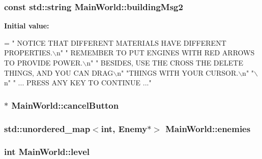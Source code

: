 \subsubsection[{building\+Msg2}]{\setlength{\rightskip}{0pt plus 5cm}const std\+::string Main\+World\+::building\+Msg2\hspace{0.3cm}{\ttfamily [private]}}\label{classMainWorld_ac33f26e815fc9f69e5119843dfc2b987}
{\bfseries Initial value\+:}
\begin{DoxyCode}
=
            \textcolor{stringliteral}{"  NOTICE THAT DIFFERENT MATERIALS HAVE DIFFERENT PROPERTIES.\(\backslash\)n"}
            \textcolor{stringliteral}{"  REMEMBER TO PUT ENGINES WITH RED ARROWS TO PROVIDE POWER.\(\backslash\)n"}
            \textcolor{stringliteral}{"  BESIDES, USE THE CROSS THE DELETE THINGS, AND YOU CAN DRAG\(\backslash\)n"}
            \textcolor{stringliteral}{"THINGS WITH YOUR CURSOR.\(\backslash\)n"}
            \textcolor{stringliteral}{"\(\backslash\)n"}
            \textcolor{stringliteral}{"  ... PRESS ANY KEY TO CONTINUE ..."}
\end{DoxyCode}
\hypertarget{classMainWorld_a44391b2d794f460d9e9898716f7c00e8}{}
\subsubsection[{cancel\+Button}]{ $\ast$ Main\+World\+::cancel\+Button\hspace{0.3cm}{\ttfamily [private]}}\label{classMainWorld_a44391b2d794f460d9e9898716f7c00e8}
\hypertarget{classMainWorld_a47830d0b4f72482d07985b94b982f4b3}{}
\subsubsection[{enemies}]{\setlength{\rightskip}{0pt plus 5cm}std\+::unordered\+\_\+map$<$int, {\bf Enemy}$\ast$$>$ Main\+World\+::enemies\hspace{0.3cm}{\ttfamily [private]}}\label{classMainWorld_a47830d0b4f72482d07985b94b982f4b3}
\hypertarget{classMainWorld_a858b57e7a6e32e4f771c66b87cfac1d7}{}
\subsubsection[{level}]{\setlength{\rightskip}{0pt plus 5cm}int Main\+World\+::level\hspace{0.3cm}{\ttfamily [private]}}\label{classMainWorld_a858b57e7a6e32e4f771c66b87cfac1d7}
\hypertarget{classMainWorld_a0d1545c344c83a85d56597b8e582a6db}{}
